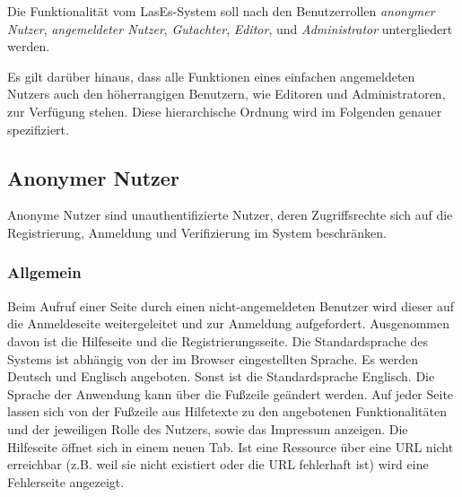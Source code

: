 
Die Funktionalität vom LasEs-System soll nach den Benutzerrollen
\textit{anonymer Nutzer}, \textit{angemeldeter Nutzer}, \textit{Gutachter}, \textit{Editor}, und
\textit{Administrator} untergliedert werden.

Es gilt darüber hinaus, dass alle Funktionen eines einfachen angemeldeten Nutzers auch den höherrangigen Benutzern, wie Editoren
und Administratoren, zur Verfügung stehen. Diese hierarchische Ordnung wird im Folgenden genauer spezifiziert.

\subsection{Anonymer Nutzer}\label{funkt:nutzer}
Anonyme Nutzer sind unauthentifizierte Nutzer, deren Zugriffsrechte sich
auf die Registrierung, Anmeldung und Verifizierung im System beschränken.

\subsubsection{Allgemein}
\begin{description}
     Beim Aufruf einer Seite durch einen nicht-angemeldeten Benutzer
    wird dieser auf die Anmeldeseite weitergeleitet und zur
    Anmeldung aufgefordert. Ausgenommen davon ist die Hilfeseite und die Registrierungsseite.
     Die Standardsprache des Systems ist abhängig von der im Browser
    eingestellten Sprache. Es werden Deutsch und Englisch angeboten.
    Sonst ist die Standardsprache Englisch. Die Sprache der Anwendung kann über die
    Fußzeile geändert werden.
     Auf jeder Seite lassen sich von der Fußzeile aus
    Hilfetexte zu den angebotenen Funktionalitäten und der jeweiligen Rolle
    des Nutzers, sowie das Impressum anzeigen. Die Hilfeseite öffnet sich in einem neuen Tab.
     Ist eine Ressource über eine URL nicht erreichbar (z.B. weil sie nicht existiert oder
     die URL fehlerhaft ist) wird eine Fehlerseite angezeigt.%
\end{description}

